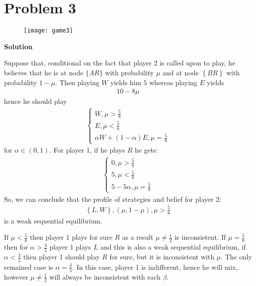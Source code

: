 \documentclass[a4paper]{article}
\begin{document}
\section*{Problem 3}
\begin{figure}[H]
	\centering
	\texttt{[image: game3]}
	\caption{}\label{fig2}
\end{figure}


\textbf{Solution}

Suppose that, conditional on the fact that player 2 is called upon to play, he believes that he is at node $\{AR\}$ with probability $\mu$ and at node $\left\{BR\right\}$ with probability $1 - \mu$. Then playing $W$ yields him $5$ whereas playing $E$ yields 
\begin{align*}
10 - 8 \mu
\end{align*}
hence he should play
\begin{align*}
\begin{cases}
W, \mu > \frac{5}{8}\\
E, \mu < \frac{5}{8}\\
\alpha W + (1 - \alpha)E, \mu = \frac{5}{8}
\end{cases}
\end{align*}
for $\alpha \in (0, 1)$. For player 1, if he plays $R$ he gets:
\begin{align*}
\begin{cases}
0, \mu > \frac{5}{8}\\
5, \mu < \frac{5}{8}\\
5 - 5\alpha, \mu = \frac{5}{8}
\end{cases}
\end{align*}
So, we can conclude that the profile of strategies and belief for player 2:
\begin{align*}
\left\{L, W\right\}, (\mu, 1-\mu), \mu > \frac{5}{8}
\end{align*}
is a weak sequential equilibrium.

If $\mu < \frac{5}{8}$ then player 1 plays for sure $R$ as a result $\mu \neq \frac{1}{2}$ is inconsistent. If $\mu = \frac{5}{8}$ then for $\alpha > \frac{3}{5}$ player 1 plays $L$ and this is also a weak sequential equilibrium, if $\alpha < \frac{3}{5}$ then player 1 should play $R$ for sure, but it is inconsistent with $\mu$. The only remained case is $\alpha = \frac{3}{5}$. In this case, player 1 is indifferent, hence he will mix, however $\mu \neq \frac{1}{2}$ will always be inconsistent with each $\beta$.
\end{document}
